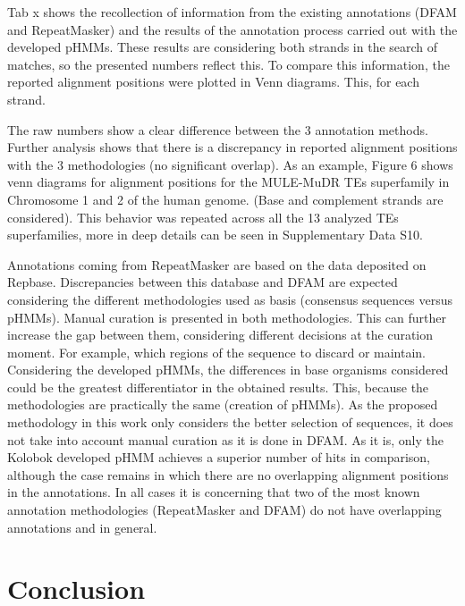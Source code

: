 \documentclass[unnumsec,webpdf,contemporary,large]{oup-authoring-template}%
\theoremstyle{thmstyleone}%
\theoremstyle{thmstyletwo}%
\theoremstyle{thmstylethree}%
\begin{document}
Tab x shows the recollection of information from the existing annotations (DFAM
and RepeatMasker) and the results of the annotation process carried out with the
developed pHMMs. These results are considering both strands in the search of
matches, so the presented numbers reflect this. To compare this information, the
reported alignment positions were plotted in Venn diagrams. This, for each
strand.

The raw numbers show a clear difference between the 3 annotation methods.
Further analysis shows that there is a discrepancy in reported alignment
positions with the 3 methodologies (no significant overlap). As an example,
Figure 6 shows venn diagrams for alignment positions for the MULE-MuDR TEs
superfamily in Chromosome 1 and 2 of the human genome. (Base and complement
strands are considered). This behavior was repeated across all the 13 analyzed
TEs superfamilies, more in deep details can be seen in Supplementary Data S10. 

Annotations coming from RepeatMasker are based on the data deposited on
Repbase. Discrepancies between this database and DFAM are expected considering
the different methodologies used as basis (consensus sequences versus pHMMs).
Manual curation is presented in both methodologies. This can further increase
the gap between them, considering different decisions at the curation moment.
For example, which regions of the sequence to discard or maintain. Considering
the developed pHMMs, the differences in base organisms considered could be the
greatest differentiator in the obtained results. This, because the methodologies
are practically the same (creation of pHMMs). As the proposed methodology in
this work only considers the better selection of sequences, it does not take
into account manual curation as it is done in DFAM\@. As it is, only the Kolobok
developed pHMM achieves a superior number of hits in comparison, although the
case remains in which there are no overlapping alignment positions in the
annotations. In all cases it is concerning that two of the most known annotation
methodologies (RepeatMasker and DFAM) do not have overlapping annotations and in
general.

\section{Conclusion}\label{sec5}
\end{document}

